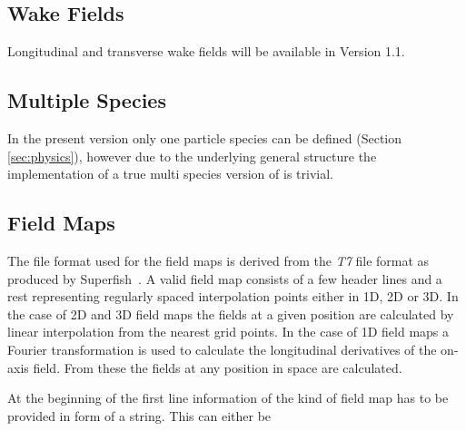 \subsection{Wake Fields}
Longitudinal and transverse wake fields will be available in Version 1.1.

\subsection{Multiple Species}
In the present version only one particle species can be defined (Section \ref{sec:physics}), however 
due to the underlying general structure the implementation of a true multi species version of \opal is 
trivial. 

\subsection{Field Maps}
\label{sec:fieldmaps}
The file format used for the field maps is derived from the  {\em T7} file format as produced by Superfish~\cite{superfish}. A valid field map consists of a few header lines and a rest representing regularly spaced interpolation points either in 1D, 2D or 3D. In the case of 2D and 3D field maps the fields at a given position are calculated by linear interpolation from the nearest grid points. In the case of 1D field maps a Fourier transformation is used to calculate the longitudinal derivatives of the on-axis field. From these the fields at any position in space are calculated.

At the beginning of the first line information of the kind of field map has to be provided in form of a string. This can either be

